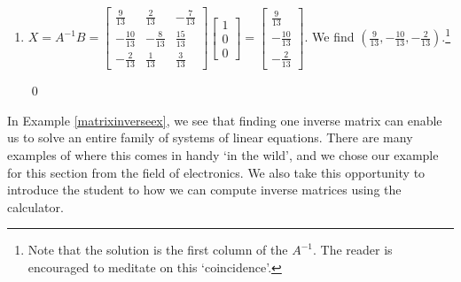 \begin{ex}
\begin{enumerate}
\begin{enumerate}
\item $X = A^{-1}B = \left[ \begin{array}{rrr} \frac{9}{13} & \frac{2}{13} & -\frac{7}{13} \\[3pt] -\frac{10}{13} & -\frac{8}{13} & \frac{15}{13} \\[3pt] -\frac{2}{13} & \frac{1}{13} & \frac{3}{13}  \end{array} \right] \left[ \begin{array}{r} 1 \\[3pt] 0 \\[3pt] 0 \end{array}\right] =  \left[ \begin{array}{r} \frac{9}{13} \\[3pt] -\frac{10}{13} \\[3pt] -\frac{2}{13} \end{array}\right]$. We find $\left( \frac{9}{13},  -\frac{10}{13},    -\frac{2}{13}   \right)$.\footnote{Note that the solution is the first column of the $A^{-1}$.  The reader is encouraged to meditate on this `coincidence'.}

\qed

\end{enumerate}

\end{enumerate}

\end{ex}

In Example \ref{matrixinverseex}, we see that finding one inverse matrix can enable us to solve an entire family of systems of linear equations.  There are many examples of where this comes in handy `in the wild', and we chose our example for this section from the field of electronics.  We also take this opportunity to introduce the student to how we can compute inverse matrices using the calculator.

